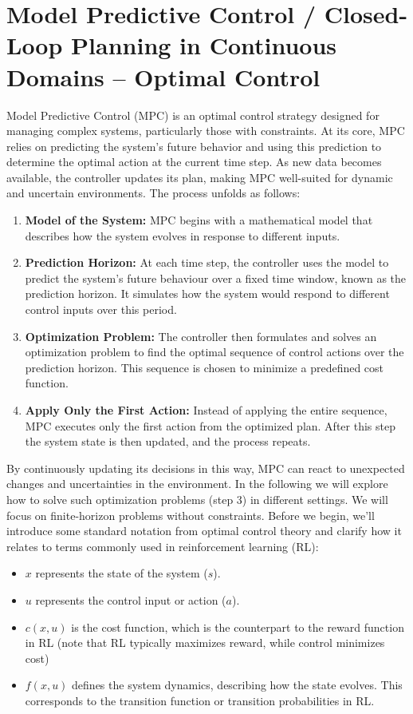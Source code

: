 \section{Model Predictive Control / Closed-Loop Planning in Continuous Domains – Optimal Control}
Model Predictive Control (MPC) is an optimal control strategy designed for managing complex systems, particularly 
those with constraints. At its core, MPC relies on predicting the system’s future behavior and using this prediction 
to determine the optimal action at the current time step. As new data becomes available, the controller updates its 
plan, making MPC well-suited for dynamic and uncertain environments. The process unfolds as follows:
\begin{enumerate}
    \item \textbf{Model of the System:} MPC begins with a mathematical model that describes how the system evolves in response to different 
    inputs.
    \item \textbf{Prediction Horizon:} At each time step, the controller uses the model to predict the system’s future behaviour over a fixed 
    time window, known as the prediction horizon. It simulates how the system would respond to different control inputs over this period.
    \item \textbf{Optimization Problem:} The controller then formulates and solves an optimization problem to find the optimal sequence of 
    control actions over the prediction horizon. This sequence is chosen to minimize a predefined cost function.
    \item \textbf{Apply Only the First Action:} Instead of applying the entire sequence, MPC executes only the first action from the 
    optimized plan. After this step the system state is then updated, and the process repeats.
\end{enumerate}
By continuously updating its decisions in this way, MPC can react to unexpected changes and uncertainties in the environment. In the 
following  we will explore how to solve such optimization problems (step 3) in different settings. We will focus on finite-horizon problems without 
constraints. Before we begin, we’ll introduce some standard notation from optimal control theory and clarify how it relates to terms commonly 
used in reinforcement learning (RL):
\begin{itemize}
    \item $x$ represents the state of the system ($s$).
    \item $u$ represents the control input or action ($a$).
    \item $c(x,u)$ is the cost function, which is the counterpart to the reward function in RL (note that RL typically maximizes reward, while control minimizes cost)
    \item $f(x,u)$ defines the system dynamics, describing how the state evolves. This corresponds to the transition function or transition probabilities in RL.
\end{itemize}

